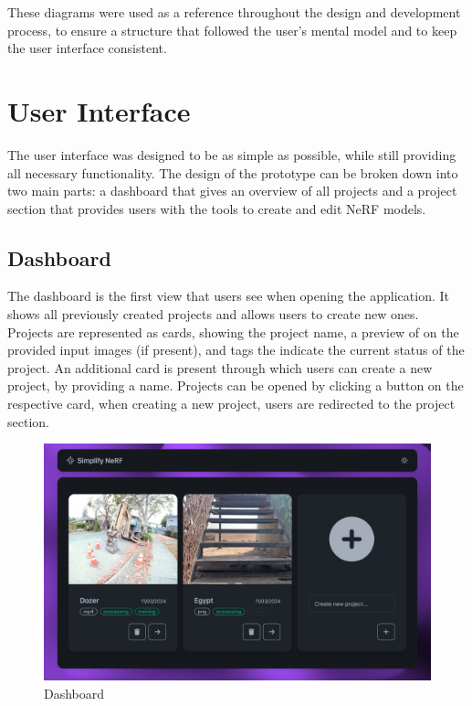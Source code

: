 These diagrams were used as a reference throughout the design and development process, to ensure a structure that followed the user's mental model and to keep the user interface consistent.

\section{User Interface}

The user interface was designed to be as simple as possible, while still providing all necessary functionality. 
The design of the prototype can be broken down into two main parts: a dashboard that gives an overview of all projects and a project section that provides users with the tools to create and edit NeRF models.

\subsection*{Dashboard}

The dashboard is the first view that users see when opening the application. It shows all previously created projects and allows users to create new ones. 
Projects are represented as cards, showing the project name, a preview of on the provided input images (if present), and tags the indicate the current status of the project.
An additional card is present through which users can create a new project, by providing a name.
Projects can be opened by clicking a button on the respective card, when creating a new project, users are redirected to the project section.

\begin{figure}[htb]
  \includegraphics[width=\textwidth]{figures/view-overview.png}
  \caption{Dashboard}
  \label{fig:design:dashboard}
\end{figure}

